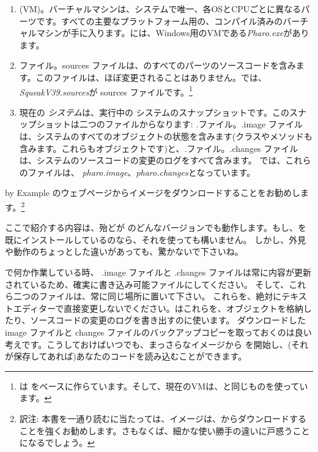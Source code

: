 \documentclass[a4paper,10pt,twoside]{book}
\begin{document}
\begin{enumerate}

  \item {} (VM)。バーチャルマシンは、システムで唯一、各OSとCPUごとに異なるパーツです。すべての主要なプラットフォーム用の、コンパイル済みのバーチャルマシンが手に入ります。には、Windows用のVMである\textit{Pharo.exe}があります。

  \item {}ファイル。sources ファイルは、\pharo のすべてのパーツのソースコードを含みます。このファイルは、ほぼ変更されることはありません。では、\emph{SqueakV39.sources}が sources ファイルです。\footnote{\pharo は  をベースに作らています。そして、現在のVMは、\squeak と同じものを使っています。}

  \item 現在の \emph{システム}は、実行中の \pharo システムのスナップショットです。このスナップショットは二つのファイルからなります: \emph{.}ファイル。.image ファイルは、システムのすべてのオブジェクトの状態を含みます(クラスやメソッドも含みます。これらもオブジェクトです)と、\emph{.}ファイル。.changes ファイルは、システムのソースコードの変更のログをすべて含みます。
では、これらのファイルは、 \emph{pharo.image}、\emph{pharo.changes}となっています。
\end{enumerate}

\pharo by Example のウェブページからイメージをダウンロードすることをお勧めします。\footnote{訳注: 本書を一通り読むに当たっては、イメージは、\pbe からダウンロードすることを強くお勧めします。さもなくば、細かな使い勝手の違いに戸惑うことになるでしょう。}

ここで紹介する内容は、殆どが \pharo のどんなバージョンでも動作します。もし、\pharo を既にインストールしているのなら、それを使っても構いません。
しかし、外見や動作のちょっとした違いがあっても、驚かないで下さいね。

\pharo で何か作業している時、 .image ファイルと .changes ファイルは常に内容が更新されているため、確実に書き込み可能ファイルにしてください。
そして、これら二つのファイルは、常に同じ場所に置いて下さい。
これらを、絶対にテキストエディターで直接変更しないでください。\pharo はこれらを、オブジェクトを格納したり、ソースコードの変更のログを書き出すのに使います。
ダウンロードした image ファイルと changes ファイルのバックアップコピーを取っておくのは良い考えです。こうしておけばいつでも、まっさらなイメージから \pharo を開始し、(それが保存してあれば)あなたのコードを読み込むことができます。
\end{document}
